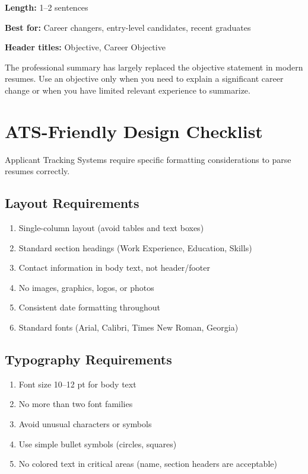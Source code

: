 \documentclass[11pt,a4paper]{article}
\begin{document}
\textbf{Length:} 1--2 sentences

\textbf{Best for:} Career changers, entry-level candidates, recent graduates

\textbf{Header titles:} Objective, Career Objective

\begin{designtip}
The professional summary has largely replaced the objective statement in modern resumes. Use an objective only when you need to explain a significant career change or when you have limited relevant experience to summarize.
\end{designtip}

\section{ATS-Friendly Design Checklist}

Applicant Tracking Systems require specific formatting considerations to parse resumes correctly.

\subsection{Layout Requirements}

\begin{enumerate}
    \item[$\square$] Single-column layout (avoid tables and text boxes)
    \item[$\square$] Standard section headings (Work Experience, Education, Skills)
    \item[$\square$] Contact information in body text, not header/footer
    \item[$\square$] No images, graphics, logos, or photos
    \item[$\square$] Consistent date formatting throughout
    \item[$\square$] Standard fonts (Arial, Calibri, Times New Roman, Georgia)
\end{enumerate}

\subsection{Typography Requirements}

\begin{enumerate}
    \item[$\square$] Font size 10--12 pt for body text
    \item[$\square$] No more than two font families
    \item[$\square$] Avoid unusual characters or symbols
    \item[$\square$] Use simple bullet symbols (circles, squares)
    \item[$\square$] No colored text in critical areas (name, section headers are acceptable)
\end{enumerate}
\end{document}
